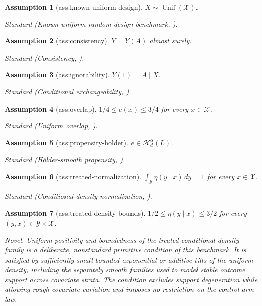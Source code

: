 \documentclass{article}
\newtheorem{assumption}{Assumption}
\begin{document}
\begin{assumption}[ass:known-uniform-design]\label{ass:known-uniform-design}
\(X\sim\operatorname{Unif}(\mathcal X)\).
\par\smallskip\noindent\emph{Standard} (Known uniform random-design benchmark, \cite{Tsybakov2009}).
\end{assumption}

\begin{assumption}[ass:consistency]\label{ass:consistency}
\(Y=Y(A)\) almost surely.
\par\smallskip\noindent\emph{Standard} (Consistency, \cite{KennedyBalakrishnanWasserman2023}).
\end{assumption}

\begin{assumption}[ass:ignorability]\label{ass:ignorability}
\(Y(1)\perp A\mid X\).
\par\smallskip\noindent\emph{Standard} (Conditional exchangeability, \cite{KennedyBalakrishnanWasserman2023}).
\end{assumption}

\begin{assumption}[ass:overlap]\label{ass:overlap}
\(1/4\le e(x)\le 3/4\) for every \(x\in\mathcal X\).
\par\smallskip\noindent\emph{Standard} (Uniform overlap, \cite{KennedyBalakrishnanWasserman2023}).
\end{assumption}

\begin{assumption}[ass:propensity-holder]\label{ass:propensity-holder}
\(e\in\mathcal H_d^{\alpha}(L)\).
\par\smallskip\noindent\emph{Standard} (Hölder-smooth propensity, \cite{KennedyEtAl2024MinimaxCATE}).
\end{assumption}

\begin{assumption}[ass:treated-normalization]\label{ass:treated-normalization}
\(\int_{\mathcal Y}\eta(y\mid x)\,dy=1\) for every \(x\in\mathcal X\).
\par\smallskip\noindent\emph{Standard} (Conditional-density normalization, \cite{KennedyBalakrishnanWasserman2023}).
\end{assumption}

\begin{assumption}[ass:treated-density-bounds]\label{ass:treated-density-bounds}
\(1/2\le\eta(y\mid x)\le3/2\) for every \((y,x)\in\mathcal Y\times\mathcal X\).
\par\smallskip\noindent\emph{Novel.} Uniform positivity and boundedness of the treated conditional-density family is a deliberate, nonstandard primitive condition of this benchmark. It is satisfied by sufficiently small bounded exponential or additive tilts of the uniform density, including the separately smooth families used to model stable outcome support across covariate strata. The condition excludes support degeneration while allowing rough covariate variation and imposes no restriction on the control-arm law.
\end{assumption}
\end{document}
